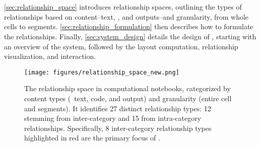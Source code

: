 \section{\tool}

\autoref{sec:relationship_space} introduces relationship spaces, outlining the types of relationships based on content--text, , and outputs--and granularity, from whole cells to segments.
\autoref{sec:relationship_formulation} then  describes how to formulate the relationships. 
Finally, \autoref{sec:system_design} details the design of \tool, starting with an overview of the system, followed by the layout computation, relationship visualization, and interaction.


\begin{figure}[t!]
    \centering
    \texttt{[image: figures/relationship\_space\_new.png]}
    \caption{The relationship space in computational notebooks, categorized by content types (\ie~text, code, and output) and granularity (entire cell and segments).
    It identifies 27 distinct relationship types: 12 stemming from inter-category and 15 from intra-category relationships.
    Specifically, 8 inter-category relationship types highlighted in \textcolor[rgb]{0.796,0.255,0.329}{red} are the primary focus of \tool.}
    \label{fig:relationship}
    \vspace{-1em}
\end{figure}



